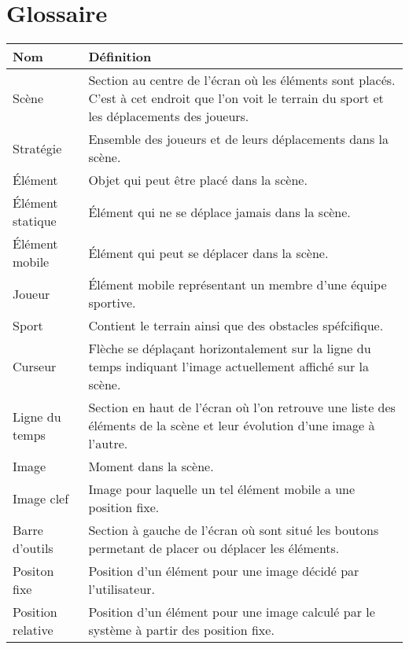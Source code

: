 \chapter{Glossaire}
\label{s:glossaire}

\begin{tabular}{|l|l|}
	\hline
	Nom & Définition \\
	\hline
	Scène 				& Section au centre de l'écran où les éléments sont placés. C'est à cet endroit que l'on voit le terrain du sport et les déplacements des joueurs. \\
	Stratégie  			& Ensemble des joueurs et de leurs déplacements dans la scène. \\
	Élément 			& Objet qui peut être placé dans la scène. \\
	Élément statique 	& Élément qui ne se déplace jamais dans la scène. \\
	Élément mobile 		& Élément qui peut se déplacer dans la scène. \\
	Joueur				& Élément mobile représentant un membre d'une équipe sportive. \\
	Sport				& Contient le terrain ainsi que des obstacles spéfcifique. \\
	Curseur 			& Flèche se déplaçant horizontalement sur la ligne du temps indiquant l'image actuellement affiché sur la scène. \\
	Ligne du temps 		& Section en haut de l'écran où l'on retrouve une liste des éléments de la scène et leur évolution d'une image à l'autre. \\
	Image				& Moment dans la scène. \\
	Image clef			& Image pour laquelle un tel élément mobile a une position fixe. \\
	Barre d'outils 		& Section à gauche de l'écran où sont situé les boutons permetant de placer ou déplacer les éléments. \\
	Positon fixe		& Position d'un élément pour une image décidé par l'utilisateur. \\
	Position relative	& Position d'un élément pour une image calculé par le système à partir des position fixe.  \\
	\hline
\end{tabular}
